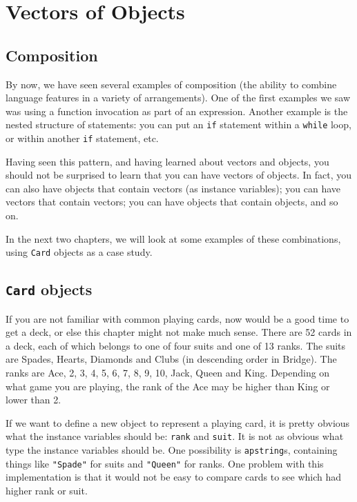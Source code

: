 


\chapter{Vectors of Objects}

\section{Composition}

By now, we have seen several examples of composition (the ability to
combine language features in a variety of arrangements).  One of the
first examples we saw was using a function invocation as part of an
expression.  Another example is the nested structure of statements:
you can put an {\tt if} statement within a {\tt while} loop, or within
another {\tt if} statement, etc.

Having seen this pattern, and having learned about vectors and objects,
you should not be surprised to learn that you can have vectors of
objects.  In fact, you can also have objects that contain vectors (as
instance variables); you can have vectors that contain vectors; you can
have objects that contain objects, and so on.

In the next two chapters, we will look at some examples of these
combinations, using {\tt Card} objects as a case study.

\section{{\tt Card} objects}

If you are not familiar with common playing cards, now would be a good
time to get a deck, or else this chapter might not make much sense.
There are 52 cards in a deck, each of which belongs to one of four
suits and one of 13 ranks.  The suits are Spades, Hearts, Diamonds and
Clubs (in descending order in Bridge).  The ranks are Ace, 2, 3, 4, 5,
6, 7, 8, 9, 10, Jack, Queen and King.  Depending on what game you are
playing, the rank of the Ace may be higher than King or lower than 2.


If we want to define a new object to represent a playing card, it is
pretty obvious what the instance variables should be: {\tt rank} and
{\tt suit}.  It is not as obvious what type the instance variables
should be.  One possibility is {\tt apstring}s, containing things like
{\tt "Spade"} for suits and {\tt "Queen"} for ranks.  One problem with
this implementation is that it would not be easy to compare cards to
see which had higher rank or suit.

